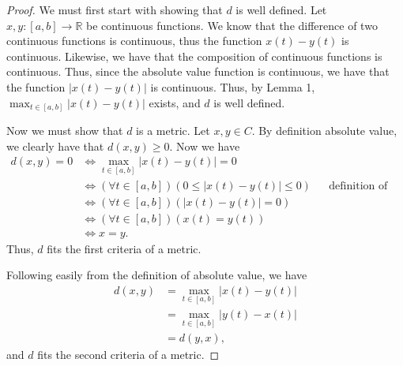 \documentclass[10pt,a4paper]{article}
\theoremstyle{theorem}
\theoremstyle{definition}
\begin{document}
\begin{proof}
We must first start with showing that $d$ is well defined.  Let $x, y: [a, b] \to \mathbb{R}$ be continuous functions.  We know that the difference of two continuous functions is continuous, thus the function $x(t) - y(t)$ is continuous. Likewise, we have that the composition of continuous functions is continuous. Thus, since the absolute value function is continuous, we have that the function $|x(t) - y(t)|$ is continuous. Thus, by Lemma 1,  $\max_{t \in [a, b]} |x(t) - y(t)|$ exists, and $d$ is well defined.

Now we must show that $d$ is a metric.  Let $x, y \in C$. By definition absolute value, we clearly have that $d(x, y) \geq 0$. Now we have
\begin{align*}
d(x, y) = 0 &\iff \max_{t \in [a, b]} |x(t) - y(t)| = 0\\
&\iff (\forall t \in [a, b])(0 \leq |x(t) - y(t)| \leq 0) && \text{definition of absolute value and max}\\
&\iff (\forall t \in [a, b])(|x(t) - y(t)| = 0)\\
&\iff (\forall t \in [a, b])(x(t) = y(t))\\
&\iff x = y.
\end{align*}
Thus, $d$ fits the first criteria of a metric.

Following easily from the definition of absolute value, we have
\begin{align*}
d(x, y) &= \max_{t \in [a, b]} |x(t) - y(t)|\\
&= \max_{t \in [a, b]} |y(t) - x(t)|\\
&= d(y, x),
\end{align*}
and $d$ fits the second criteria of a metric.


\end{proof}
\end{document}
